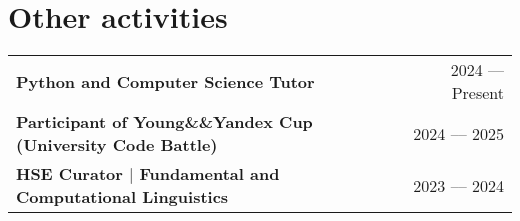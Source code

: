 \documentclass[a4paper,10pt]{article}
\begin{document}

\section{Other activities}
\setlength{\tabcolsep}{2.7cm}

\begin{tabularx}{\linewidth}{ @{}l r@{}}
\textbf{Python and Computer Science Tutor} & 2024 –– Present \\[3.75pt]

\textbf{Participant of Young\&\&Yandex Cup (University Code Battle)} & 2024 –– 2025 \\[3.75pt]

\textbf{HSE Curator $\mid$ Fundamental and Computational Linguistics} & 2023 –– 2024 \\ [3.75pt]

\end{tabularx}



\vfill
{}
\end{document}
